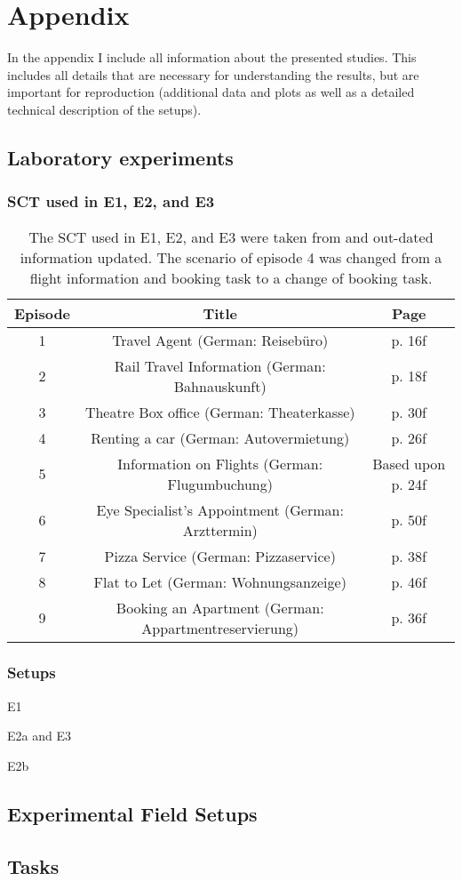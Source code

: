 \chapter{Appendix}\label{chap:appendix}
\begin{chapter-abstract}
In the appendix I include all information about the presented studies.
This includes all details that are necessary for understanding the results, but are important for reproduction (additional data and plots as well as a detailed technical description of the setups).
\end{chapter-abstract}


\section{Laboratory experiments}\label{appendix:laboratorySetups}

\subsection{\acs{SCT} used in E1, E2, and E3}
\begin{table}
	\centering
	\begin{tabular}{c|c|c}
	Episode & Title & Page \\
	\hline
	1 & Travel Agent (German: Reisebüro) & p. 16f \\
	2 & Rail Travel Information (German: Bahnauskunft) & p. 18f \\
	3 & Theatre Box office (German: Theaterkasse) & p. 30f \\
	4 & Renting a car (German: Autovermietung) & p. 26f \\
	5 & Information on Flights (German: Flugumbuchung) & Based upon p. 24f \\
	6 & Eye Specialist's Appointment (German: Arzttermin) & p. 50f \\
	7 & Pizza Service (German: Pizzaservice) & p. 38f \\
	8 & Flat to Let (German: Wohnungsanzeige) & p. 46f \\
	9 & Booking an Apartment (German: Appartmentreservierung) & p. 36f \\
	\end{tabular}
	\caption{The \acs{SCT} used in E1, E2, and E3 were taken from \cite{itu-t_p.805:_2007} and out-dated information updated. The scenario of episode 4 was changed from a flight information and booking task to a change of booking task.}
	\label{tab:appendix:labsct}
\end{table}

\subsection{Setups}
E1

E2a and E3

E2b

\section{Experimental Field Setups}



\section{Tasks}


